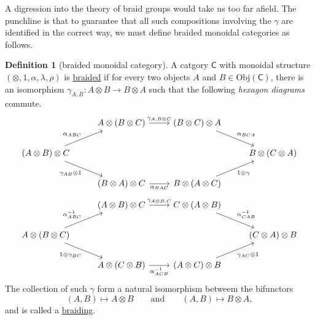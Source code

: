 \documentclass[a4paper]{report}
\newcommand{\defn}[1]{\ul{#1}}
\newcommand{\Obj}{\mathrm{Obj}}
\theoremstyle{definition}
\newtheorem{definition}{Definition}[section]
\theoremstyle{plain}
\theoremstyle{remark}
\begin{document}
A digression into the theory of braid groups would take us too far afield. The punchline is that to guarantee that all such compositions involving the $\gamma$ are identified in the correct way, we must define braided monoidal categories as follows.

\begin{definition}[braided monoidal category]
  \label{def:braidedmonoidalcategory}
  A catgory $\mathsf{C}$ with monoidal structure $(\otimes, 1, \alpha, \lambda, \rho)$ is \defn{braided} if for every two objects $A$ and $B \in \Obj(\mathsf{C})$, there is an isomorphism $\gamma_{A,B}\colon A \otimes B \to B \otimes A$ such that the following \emph{hexagon diagrams} commute.
  \begin{equation*}
    \begin{tikzcd}
      & A \otimes (B \otimes C) \arrow[r, "{\gamma_{A, B \otimes C}}"] & (B \otimes C) \otimes A \arrow[dr, "\alpha_{BCA}"] & \\
      (A \otimes B) \otimes C \arrow[ur, "\alpha_{ABC}"] \arrow[dr, swap, "\gamma_{AB} \otimes 1"] & & & B \otimes (C \otimes A) \\
      & (B \otimes A) \otimes C \arrow[r, swap, "\alpha_{BAC}"] & B \otimes (A \otimes C) \arrow[ur, swap, "1 \otimes \gamma"]
    \end{tikzcd}
  \end{equation*}
  \begin{equation*}
    \begin{tikzcd}
      & (A \otimes B) \otimes C \arrow[r, "{\gamma_{A \otimes B, C}}"] & C \otimes (A \otimes B) \arrow[dr, "\alpha^{-1}_{CAB}"] \\
      A \otimes (B \otimes C) \arrow[ur, "\alpha_{ABC}^{-1}"] \arrow[dr, swap, "1 \otimes \gamma_{BC}"] & & & (C \otimes A) \otimes B \\
      & A \otimes (C \otimes B) \arrow[r, swap, "\alpha^{-1}_{ACB}"] & (A \otimes C) \otimes B \arrow[ur, swap, "\gamma_{AC} \otimes 1"]
    \end{tikzcd} 
  \end{equation*}
  The collection of such $\gamma$ form a natural isomorphism betweem the bifunctors 
  \begin{equation*}
    (A, B) \mapsto A \otimes B\qquad\text{and}\qquad (A,B) \mapsto B \otimes A,
  \end{equation*}
  and is called a \defn{braiding}.
\end{definition}
\end{document}
